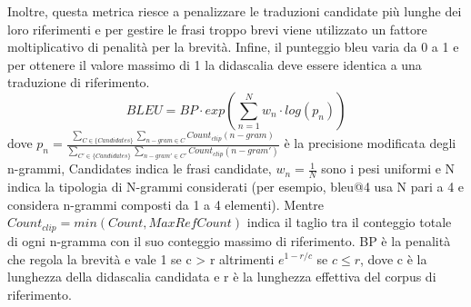 Inoltre, questa metrica riesce a penalizzare le traduzioni candidate più lunghe dei loro riferimenti e per gestire le frasi troppo brevi viene utilizzato un fattore moltiplicativo di penalità per la brevità.
Infine, il punteggio \acrshort{bleu} varia da 0 a 1 e per ottenere il valore massimo di 1 la didascalia deve essere identica a una traduzione di riferimento.
\begin{equation*}
BLEU = BP \cdot exp(\sum_{n=1}^N w_n \cdot log(p_n))
\end{equation*}
dove $p_n = \frac{\sum_{C \in \{Candidates\}} \sum_{n-gram \in C} Count_{clip} (n-gram)} {\sum_{C' \in \{Candidates\}} \sum_{n-gram' \in C'} Count_{clip} (n-gram')}$ è la precisione modificata degli n-grammi, Candidates indica le frasi candidate, $w_n = \frac{1}{N}$ sono i pesi uniformi e N indica la tipologia di N-grammi considerati (per esempio, \acrshort{bleu}@4 usa N pari a 4 e considera n-grammi composti da 1 a 4 elementi). Mentre $Count_{clip} = min(Count, MaxRefCount)$ indica il taglio tra il conteggio totale di ogni n-gramma con il suo conteggio massimo di riferimento.
BP è la penalità che regola la brevità e vale 1 se c > r altrimenti $e^{1-r/c}$ se  $c \leq r$, dove c è la lunghezza della didascalia candidata e r è la lunghezza effettiva del corpus di riferimento.

